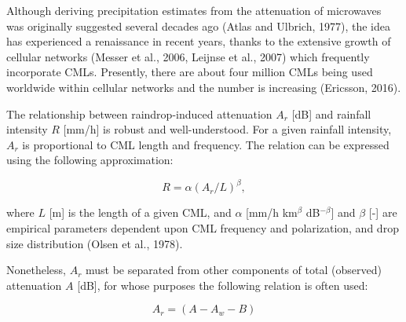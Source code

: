 \documentclass{ctuthesis}\usepackage[]{graphicx}\usepackage[]{color}
\begin{document}
Although deriving precipitation estimates from the attenuation of microwaves was originally suggested several decades ago (Atlas and Ulbrich, 1977), the idea has experienced a renaissance in recent years, thanks to the extensive growth of cellular networks (Messer et al., 2006, Leijnse et al., 2007) which frequently incorporate CMLs. Presently, there are about four million CMLs being used worldwide within cellular networks and the number is increasing (Ericsson, 2016).

The relationship between raindrop-induced attenuation $A_r$ [dB] and rainfall intensity $R$ [mm/h] is robust and well-understood. For a given rainfall intensity, $A_r$ is proportional to CML length and frequency. The relation can be expressed using the following approximation: 

\begin{equation} \label{2eq1}
R = \alpha (A_r / L)^\beta,
\end{equation}


where $L$ [m] is the length of a given CML, and $\alpha$ [mm/h km$^\beta$ dB$^{-\beta}$] and $\beta$ [-] are empirical parameters dependent upon CML frequency and polarization, and drop size distribution (Olsen et al., 1978).

Nonetheless, $A_r$ must be separated from other components of total (observed) attenuation $A$ [dB], for whose purposes the following relation is often used: 

\begin{equation} \label{2eq2}
A_r = (A - A_w - B)
\end{equation}
\end{document}
